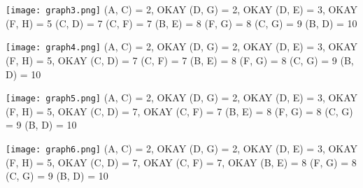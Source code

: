 \documentclass{article}
\begin{document}
\texttt{[image: graph3.png]}
\newline
(A, C) = 2, OKAY
\newline
(D, G) = 2, OKAY
\newline
(D, E) = 3, OKAY
\newline
(F, H) = 5
\newline
(C, D) = 7
\newline
(C, F) = 7
\newline
(B, E) = 8
\newline
(F, G) = 8
\newline
(C, G) = 9
\newline
(B, D) = 10

\texttt{[image: graph4.png]}
\newline
(A, C) = 2, OKAY
\newline
(D, G) = 2, OKAY
\newline
(D, E) = 3, OKAY
\newline
(F, H) = 5, OKAY
\newline
(C, D) = 7
\newline
(C, F) = 7
\newline
(B, E) = 8
\newline
(F, G) = 8
\newline
(C, G) = 9
\newline
(B, D) = 10

\texttt{[image: graph5.png]}
\newline
(A, C) = 2, OKAY
\newline
(D, G) = 2, OKAY
\newline
(D, E) = 3, OKAY
\newline
(F, H) = 5, OKAY
\newline
(C, D) = 7, OKAY
\newline
(C, F) = 7
\newline
(B, E) = 8
\newline
(F, G) = 8
\newline
(C, G) = 9
\newline
(B, D) = 10

\texttt{[image: graph6.png]}
\newline
(A, C) = 2, OKAY
\newline
(D, G) = 2, OKAY
\newline
(D, E) = 3, OKAY
\newline
(F, H) = 5, OKAY
\newline
(C, D) = 7, OKAY
\newline
(C, F) = 7, OKAY
\newline
(B, E) = 8
\newline
(F, G) = 8
\newline
(C, G) = 9
\newline
(B, D) = 10
\end{document}
